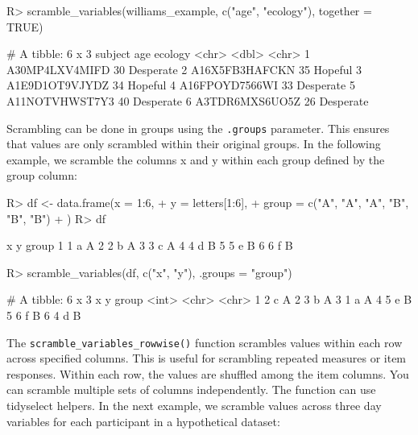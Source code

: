 \documentclass[
]{jss}
\begin{document}
\begin{CodeChunk}
\begin{CodeInput}
R> scramble_variables(williams_example, c("age", "ecology"), together = TRUE)
\end{CodeInput}
\begin{CodeOutput}
# A tibble: 6 x 3
  subject          age ecology  
  <chr>          <dbl> <chr>    
1 A30MP4LXV4MIFD    30 Desperate
2 A16X5FB3HAFCKN    35 Hopeful  
3 A1E9D1OT9VJYDZ    34 Hopeful  
4 A16FPOYD7566WI    33 Desperate
5 A11NOTVHWST7Y3    40 Desperate
6 A3TDR6MXS6UO5Z    26 Desperate
\end{CodeOutput}
\end{CodeChunk}

Scrambling can be done in groups using the \texttt{.groups} parameter.
This ensures that values are only scrambled within their original
groups. In the following example, we scramble the columns x and y within
each group defined by the group column:

\begin{CodeChunk}
\begin{CodeInput}
R> df <- data.frame(x = 1:6,
+                  y = letters[1:6],
+                  group = c("A", "A", "A", "B", "B", "B")
+                  )
R> df 
\end{CodeInput}
\begin{CodeOutput}
  x y group
1 1 a     A
2 2 b     A
3 3 c     A
4 4 d     B
5 5 e     B
6 6 f     B
\end{CodeOutput}
\begin{CodeInput}
R> scramble_variables(df, c("x", "y"), .groups = "group")
\end{CodeInput}
\begin{CodeOutput}
# A tibble: 6 x 3
      x y     group
  <int> <chr> <chr>
1     2 c     A    
2     3 b     A    
3     1 a     A    
4     5 e     B    
5     6 f     B    
6     4 d     B    
\end{CodeOutput}
\end{CodeChunk}

The \texttt{scramble\_variables\_rowwise()} function scrambles values
within each row across specified columns. This is useful for scrambling
repeated measures or item responses. Within each row, the values are
shuffled among the item columns. You can scramble multiple sets of
columns independently. The function can use tidyselect helpers. In the
next example, we scramble values across three day variables for each
participant in a hypothetical dataset:
\end{document}

